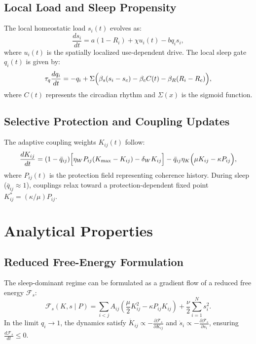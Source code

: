 \documentclass[12pt]{article}
\begin{document}
\subsection{Local Load and Sleep Propensity}
The local homeostatic load $s_i(t)$ evolves as:
\begin{equation}
    \frac{ds_i}{dt} = a(1 - R_i) + \chi u_i(t) - b q_i s_i,
\end{equation}
where $u_i(t)$ is the spatially localized use-dependent drive. The local sleep gate $q_i(t)$ is given by:
\begin{equation}
    \tau_q \frac{dq_i}{dt} = -q_i + \Sigma\Bigl(\beta_s(s_i - s_c) - \beta_c C(t) - \beta_R(R_i - R_c)\Bigr),
\end{equation}
where $C(t)$ represents the circadian rhythm and $\Sigma(x)$ is the sigmoid function.

\subsection{Selective Protection and Coupling Updates}
The adaptive coupling weights $K_{ij}(t)$ follow:
\begin{equation}
    \frac{dK_{ij}}{dt} = (1 - \bar{q}_{ij}) \Bigl[ \eta_W P_{ij} (K_{\max} - K_{ij}) - \delta_W K_{ij} \Bigr] - \bar{q}_{ij} \eta_K \Bigl( \mu K_{ij} - \kappa P_{ij} \Bigr),
\end{equation}
where $P_{ij}(t)$ is the protection field representing coherence history. During sleep ($\bar{q}_{ij} \approx 1$), couplings relax toward a protection-dependent fixed point $K_{ij}^* = (\kappa/\mu) P_{ij}$.

\section{Analytical Properties}

\subsection{Reduced Free-Energy Formulation}
The sleep-dominant regime can be formulated as a gradient flow of a reduced free energy $\mathcal{F}_s$:
\begin{equation}
    \mathcal{F}_s(K, s \mid P) = \sum_{i<j} A_{ij} \left( \frac{\mu}{2} K_{ij}^2 - \kappa P_{ij} K_{ij} \right) + \frac{\nu}{2} \sum_{i=1}^{N} s_i^2.
\end{equation}
In the limit $q_i \to 1$, the dynamics satisfy $\dot{K}_{ij} \propto -\frac{\partial \mathcal{F}_s}{\partial K_{ij}}$ and $\dot{s}_i \propto -\frac{\partial \mathcal{F}_s}{\partial s_i}$, ensuring $\frac{d\mathcal{F}_s}{dt} \le 0$.
\end{document}
